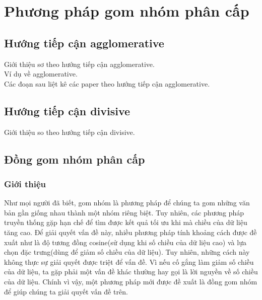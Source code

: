 \chapter{Phương pháp gom nhóm phân cấp}
\label{Chapter2}

\section{Hướng tiếp cận agglomerative}
\hspace{10mm}Giới thiệu sơ theo hướng tiếp cận agglomerative.\\
\hspace*{10mm}Ví dụ về agglomerative.\\
\hspace*{10mm}Các đoạn sau liệt kê các paper theo hướng tiếp cận agglomerative.\\


\section{Hướng tiếp cận divisive}
\hspace{10mm}Giới thiệu so theo hướng tiếp cận divisive.\\

\section{Đồng gom nhóm phân cấp}
\subsection{Giới thiệu}
\noindent
\hspace{10mm}Như mọi người đã biết, gom nhóm là phương pháp để chúng ta gom những văn bản gần giống nhau thành một nhóm riêng biệt. Tuy nhiên, các phương pháp truyền thống gặp hạn chế để tìm được kết quả tối ưu khi mà chiều của dữ liệu tăng cao. Để giải quyết vấn đề này, nhiều phương pháp tính khoảng cách được đề xuất như là độ tương đồng cosine(sử dụng khi số chiều của dữ liệu cao) và lựa chọn đặc trưng(dùng để giảm số chiều của dữ liệu). Tuy nhiên, những cách này không thực sự giải quyết được triệt để vấn đề. Vì nếu cố gắng làm giảm số chiều của dữ liệu, ta gặp phải một vấn đề khác thường hay gọi là lời nguyền về số chiều của dữ liệu. Chính vì vậy, một phương pháp mới được đề xuất là đồng gom nhóm để giúp chúng ta giải quyết vấn đề trên.\\

